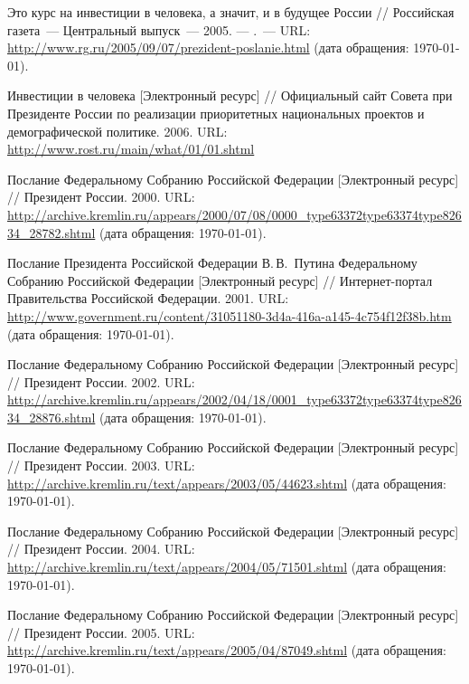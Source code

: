 \documentclass[article, 12pt, russian, oneside]{ncc}
\begin{document}
\begin{thebibliography}{30}
 Это курс на инвестиции в человека, а значит, и в
  будущее России // Российская газета~--- Центральный выпуск~---
  2005. — .~--- URL:
  \url{http://www.rg.ru/2005/09/07/prezident-poslanie.html} (дата
  обращения: \today).

 Инвестиции в человека [Электронный ресурс] //
  Официальный сайт Совета при Президенте России по реализации
  приоритетных национальных проектов и демографической
  политике. 2006. URL: \url{http://www.rost.ru/main/what/01/01.shtml}

 Послание Федеральному Собранию Российской
  Федерации [Электронный ресурс] // Президент России. 2000. URL:
  \url{http://archive.kremlin.ru/appears/2000/07/08/0000_type63372type63374type82634_28782.shtml}
  (дата обращения: \today).

Послание Президента Российской Федерации
  В.\,В.~Путина Федеральному Собранию Российской Федерации
  [Электронный ресурс] // Интернет-портал Правительства Российской
  Федерации. 2001. URL:
  \url{http://www.government.ru/content/31051180-3d4a-416a-a145-4c754f12f38b.htm}
  (дата обращения: \today).

 Послание Федеральному Собранию Российской
  Федерации [Электронный ресурс] // Президент России. 2002. URL:
  \url{http://archive.kremlin.ru/appears/2002/04/18/0001_type63372type63374type82634_28876.shtml}
  (дата обращения: \today).

 Послание Федеральному Собранию Российской
  Федерации [Электронный ресурс] // Президент России. 2003. URL:
  \url{http://archive.kremlin.ru/text/appears/2003/05/44623.shtml}
  (дата обращения: \today).

 Послание Федеральному Собранию Российской
  Федерации [Электронный ресурс] // Президент России. 2004. URL:
  \url{http://archive.kremlin.ru/text/appears/2004/05/71501.shtml}
  (дата обращения: \today).

 Послание Федеральному Собранию Российской
  Федерации [Электронный ресурс] // Президент России. 2005. URL:
  \url{http://archive.kremlin.ru/text/appears/2005/04/87049.shtml}
  (дата обращения: \today).


\end{thebibliography}
\end{document}
